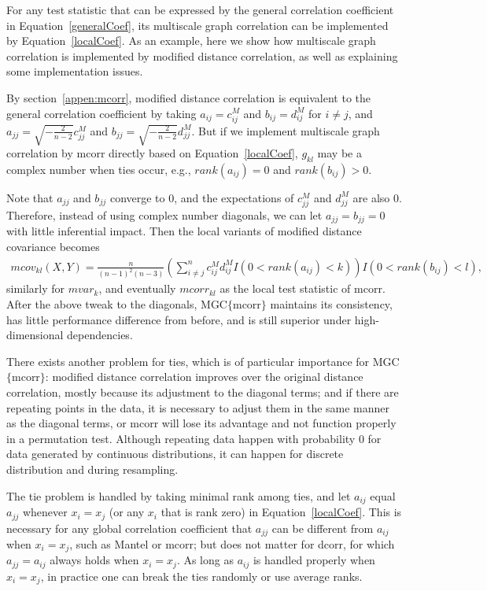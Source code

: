 \documentclass[11pt]{article}
\begin{document}
For any test statistic that can be expressed by the general correlation coefficient in Equation~\ref{generalCoef}, its multiscale graph correlation can be implemented by Equation~\ref{localCoef}. As an example, here we show how multiscale graph correlation is implemented by modified distance correlation, as well as explaining some implementation issues.

By section~\ref{appen:mcorr}, modified distance correlation is equivalent to the general correlation coefficient by taking $a_{ij}=c^{M}_{ij}$ and $b_{ij}=d^{M}_{ij}$ for $i \neq j$, and $a_{jj}=\sqrt{-\frac{2}{n-2}}c^{M}_{jj}$ and $b_{jj}=\sqrt{-\frac{2}{n-2}}d^{M}_{jj}$. But if we implement multiscale graph correlation by mcorr directly based on Equation~\ref{localCoef}, $g_{kl}$ may be a complex number when ties occur, e.g., $rank(a_{ij})=0$ and $rank(b_{ij})>0$.

Note that $a_{jj}$ and $b_{jj}$ converge to $0$, and the expectations of $c^{M}_{jj}$ and $d^{M}_{jj}$ are also $0$. Therefore, instead of using complex number diagonals, we can let $a_{jj}=b_{jj}=0$ with little inferential impact. Then the local variants of modified distance covariance becomes
\begin{align*}
mcov_{kl}(X,Y) = \frac{n}{(n-1)^2(n-3)}(\sum_{i \neq j}^{n}c^{M}_{ij}d^{M}_{ij}I(0<rank(a_{ij})<k))I(0<rank(b_{ij})<l),
\end{align*}
similarly for $mvar_{k}$, and eventually $mcorr_{kl}$ as the local test statistic of mcorr. After the above tweak to the diagonals, MGC$\{$mcorr$\}$ maintains its consistency, has little performance difference from before, and is still superior under high-dimensional dependencies.

There exists another problem for ties, which is of particular importance for MGC$\{$mcorr$\}$: modified distance correlation improves over the original distance correlation, mostly because its adjustment to the diagonal terms; and if there are repeating points in the data, it is necessary to adjust them in the same manner as the diagonal terms, or mcorr will lose its advantage and not function properly in a permutation test. Although repeating data happen with probability $0$ for data generated by continuous distributions, it can happen for discrete distribution and during resampling.

The tie problem is handled by taking minimal rank among ties, and let $a_{ij}$ equal $a_{jj}$ whenever $x_{i}=x_{j}$ (or any $x_{i}$ that is rank zero) in Equation~\ref{localCoef}. This is necessary for any global correlation coefficient that $a_{jj}$ can be different from $a_{ij}$ when $x_{i}=x_{j}$, such as Mantel or mcorr; but does not matter for dcorr, for which $a_{jj}=a_{ij}$ always holds when $x_{i}=x_{j}$. As long as $a_{ij}$ is handled properly when $x_{i}=x_{j}$, in practice one can break the ties randomly or use average ranks.
\end{document}
